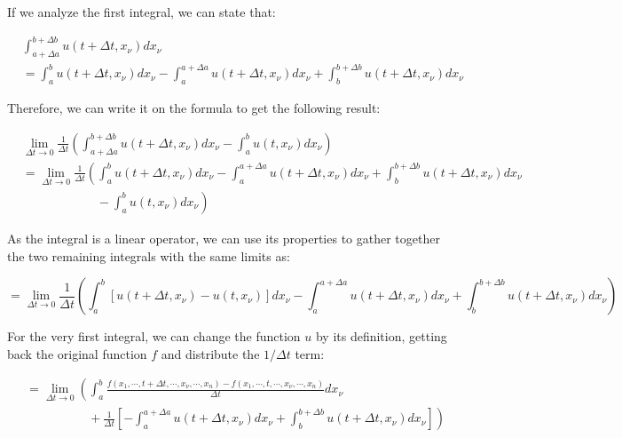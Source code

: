 \documentclass[12pt]{article}
\begin{document}
	If we analyze the first integral, we can state that:
	
	\[
		\begin{aligned}
			& \int_{a + \Delta a}^{b + \Delta b} u(t + \Delta t, x_\nu) dx_\nu
			\\
			& = \int_a^b u(t + \Delta t, x_\nu) dx_\nu - \int_a^{a + \Delta a} u(t + \Delta t, x_\nu) dx_\nu + \int_b^{b + \Delta b} u(t + \Delta t, x_\nu) dx_\nu
		\end{aligned}
	\]
	
	Therefore, we can write it on the formula to get the following result:
	
	\[
		\begin{aligned}
			& \lim_{\Delta t \to 0} \frac{1}{\Delta t} \left( \int_{a + \Delta a}^{b + \Delta b} u(t + \Delta t, x_\nu) dx_\nu - \int_a^b u(t, x_\nu) dx_\nu \right)
			\\
			& = \lim_{\Delta t \to 0} \frac{1}{\Delta t} \left( \int_a^b u(t + \Delta t, x_\nu) dx_\nu - \int_a^{a + \Delta a} u(t + \Delta t, x_\nu) dx_\nu + \int_b^{b + \Delta b} u(t + \Delta t, x_\nu) dx_\nu \right.
			\\
			& \left. \hspace{6em} - \int_a^b u(t, x_\nu) dx_\nu \right)
		\end{aligned}
	\]
	
	As the integral is a linear operator, we can use its properties to gather together the two remaining integrals with the same limits as:
	
	\[
		= \lim_{\Delta t \to 0} \frac{1}{\Delta t} \left( \int_a^b [ u(t + \Delta t, x_\nu) - u(t, x_\nu) ] dx_\nu - \int_a^{a + \Delta a} u(t + \Delta t, x_\nu) dx_\nu + \int_b^{b + \Delta b} u(t + \Delta t, x_\nu) dx_\nu \right)
	\]
	
	For the very first integral, we can change the function $u$ by its definition, getting back the original function $f$ and distribute the $1/\Delta t$ term:
	
	\[
		\begin{aligned}
			& = \lim_{\Delta t \to 0} \left( \int_a^b \frac{f(x_1, \cdots, t + \Delta t, \cdots,  x_\nu, 	\cdots, x_n) - f(x_1, \cdots, t, \cdots,  x_\nu, \cdots, x_n)}{\Delta t} dx_\nu \right.
			\\
			& \left. \hspace{5em} + \frac{1}{\Delta t} \left[ - \int_a^{a + \Delta a} u(t + \Delta t, x_\nu) dx_\nu + \int_b^{b + \Delta b} u(t + \Delta t, x_\nu) dx_\nu \right] \right)
		\end{aligned}
	\]
	
\end{document}
